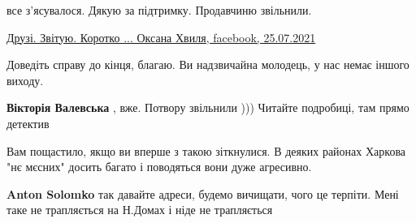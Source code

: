 \begin{itemize}
\begin{itemize}
все з'ясувалося. Дякую за підтримку. Продавчиню звільнили.

\href{https://www.facebook.com/xunmeya/posts/3003644583244885}{%
Друзі. Звітую. Коротко ... Оксана Хвиля, facebook, 25.07.2021%
}

\end{itemize}

 
Доведіть справу до кінця, благаю. Ви надзвичайна молодець, у нас немає іншого виходу.

\begin{itemize}
 
\textbf{Вікторія Валевська} , вже. Потвору звільнили ))) Читайте подробиці, там прямо детектив
\end{itemize}

 
Вам пощастило, якщо ви вперше з такою зіткнулися. В деяких районах Харкова "нє
мєсних" досить багато і поводяться вони дуже агресивно.

\begin{itemize}
 
\textbf{Anton Solomko} так давайте адреси, будемо вичищати, чого це терпіти. Мені таке не трапляється на Н.Домах і ніде не трапляється
\end{itemize}

 

\end{itemize}
